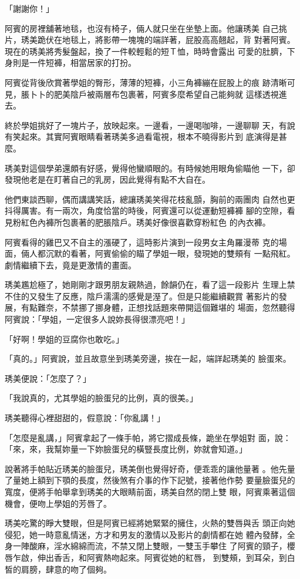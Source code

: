 「謝謝你！」

阿賓的房裡舖著地毯，也沒有椅子，倆人就只坐在坐墊上面。他讓琇美
自己挑片，琇美跪伏在地毯上，將影帶一塊塊的端詳著，屁股高高翹起，背
對著阿賓。現在的琇美將秀髮盤起，換了一件較輕鬆的短Ｔ恤，時時會露出
可愛的肚臍，下身則是一件短褲，相當居家的打扮。

阿賓從背後欣賞著學姐的臀形，薄薄的短褲，小三角褲繃在屁股上的痕
跡清晰可見，脹卜卜的肥美陰戶被兩層布包裹著，阿賓多麼希望自己能夠就
這樣透視進去。

終於學姐挑好了一塊片子，放映起來。一邊看，一邊喝咖啡，一邊聊聊
天，有說有笑起來。其實阿賓眼睛看著琇美多過看電視，根本不曉得影片到
底演得是甚麼。

琇美對這個學弟還頗有好感，覺得他蠻順眼的。有時候她用眼角偷瞄他
一下，卻發現他老是在盯著自己的乳房，因此覺得有點不大自在。

他們東談西聊，偶而講講笑話，總讓琇美笑得花枝亂顫，胸前的兩團肉
自然也更抖得厲害。有一兩次，角度恰當的時後，阿賓還可以從運動短褲褲
腳的空隙，看見粉紅色內褲所包裹著的肥脹陰戶。琇美好像很喜歡穿粉紅色
的內衣褲。

阿賓看得的雞巴又不自主的漲硬了，這時影片演到一段男女主角羅漫蒂
克的場面，倆人都沉默的看著，阿賓偷偷的瞄了學姐一眼，發現她的雙頰有
一點飛紅。劇情繼續下去，竟是更激情的畫面。

琇美尷尬極了，她剛剛才跟男朋友親熱過，餘韻仍在，看了這一段影片
生理上禁不住的又發生了反應，陰戶濡濡的感覺是溼了。但是只能繼續觀賞
著影片的發展，有點難奈，不禁挪了挪身體，正想找話題來帶開這個難堪的
場面，忽然聽得阿賓說：「學姐，一定很多人說妳長得很漂亮吧！」

「好啊！學姐的豆腐你也敢吃。」

「真的。」阿賓說，並且故意坐到琇美旁邊，挨在一起，端詳起琇美的
臉蛋來。

琇美便說：「怎麼了？」

「我說真的，尤其學姐的臉蛋兒的比例，真的很美。」

琇美聽得心裡甜甜的，假意說：「你亂講！」

「怎麼是亂講，」阿賓拿起了一條手帕，將它摺成長條，跪坐在學姐對
面，說：「來，來，我幫妳量一下妳臉蛋兒的橫豎長度比例，妳就會知道。」

說著將手帕貼近琇美的臉蛋兒，琇美倒也覺得好奇，便乖乖的讓他量著
。他先量了量她上額到下顎的長度，然後煞有介事的作下記號，接著他作勢
要量臉蛋兒的寬度，便將手帕舉拿到琇美的大眼睛前面，琇美自然的閉上雙
眼，阿賓乘著這個機會，便吻上學姐的芳唇了。

琇美吃驚的睜大雙眼，但是阿賓已經將她緊緊的擁住，火熱的雙唇與舌
頭正向她侵犯，她一時意亂情迷，方才和男友的激情以及影片的劇情都在她
體內發酵，全身一陣酸麻，淫水綿綿而流，不禁又閉上雙眼，一雙玉手攀住
了阿賓的頸子，櫻唇乍啟，伸出香舌，和阿賓熱吻起來。阿賓從她的紅唇，
到雙頰，到耳朵，到白皙的肩膀，肆意的吻了個夠。

